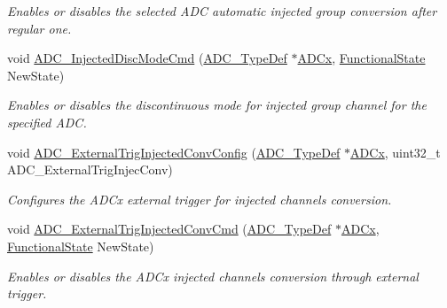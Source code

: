 \begin{DoxyCompactItemize}
\begin{DoxyCompactList}\small\item\em Enables or disables the selected A\+DC automatic injected group conversion after regular one. \end{DoxyCompactList}\item 
void \mbox{\hyperlink{group___a_d_c___exported___functions_ga0b583b94183fa4ff287177b9ee808092}{A\+D\+C\+\_\+\+Injected\+Disc\+Mode\+Cmd}} (\mbox{\hyperlink{struct_a_d_c___type_def}{A\+D\+C\+\_\+\+Type\+Def}} $\ast$\mbox{\hyperlink{group___s_t_m32_f1_x_x___n_u_c_l_e_o___l_o_w___l_e_v_e_l___exported___constants_gab44c1065d38c298955fc028346984340}{A\+D\+Cx}}, \mbox{\hyperlink{group___exported__types_gac9a7e9a35d2513ec15c3b537aaa4fba1}{Functional\+State}} New\+State)
\begin{DoxyCompactList}\small\item\em Enables or disables the discontinuous mode for injected group channel for the specified A\+DC. \end{DoxyCompactList}\item 
void \mbox{\hyperlink{group___a_d_c___exported___functions_gafc02ce1e84e96b692adf085f61a0bca6}{A\+D\+C\+\_\+\+External\+Trig\+Injected\+Conv\+Config}} (\mbox{\hyperlink{struct_a_d_c___type_def}{A\+D\+C\+\_\+\+Type\+Def}} $\ast$\mbox{\hyperlink{group___s_t_m32_f1_x_x___n_u_c_l_e_o___l_o_w___l_e_v_e_l___exported___constants_gab44c1065d38c298955fc028346984340}{A\+D\+Cx}}, uint32\+\_\+t A\+D\+C\+\_\+\+External\+Trig\+Injec\+Conv)
\begin{DoxyCompactList}\small\item\em Configures the A\+D\+Cx external trigger for injected channels conversion. \end{DoxyCompactList}\item 
void \mbox{\hyperlink{group___a_d_c___exported___functions_gad81d134c083d8f407c819e6f4722d553}{A\+D\+C\+\_\+\+External\+Trig\+Injected\+Conv\+Cmd}} (\mbox{\hyperlink{struct_a_d_c___type_def}{A\+D\+C\+\_\+\+Type\+Def}} $\ast$\mbox{\hyperlink{group___s_t_m32_f1_x_x___n_u_c_l_e_o___l_o_w___l_e_v_e_l___exported___constants_gab44c1065d38c298955fc028346984340}{A\+D\+Cx}}, \mbox{\hyperlink{group___exported__types_gac9a7e9a35d2513ec15c3b537aaa4fba1}{Functional\+State}} New\+State)
\begin{DoxyCompactList}\small\item\em Enables or disables the A\+D\+Cx injected channels conversion through external trigger. \end{DoxyCompactList}\item 

\end{DoxyCompactItemize}
